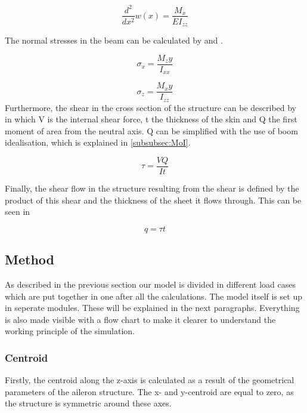\begin{equation}
    \frac{d^2}{d x^2}w(x) = \frac{M_x}{E I_{zz}}
    \label{eq:Beamformula}
\end{equation}

\noindent The normal stresses in the beam can be calculated by  and  \cite{the_book}.

\begin{equation}
    \sigma_x = \frac{M_z y}{I_{xx}}
    \label{eq:stress_bending_x}
\end{equation}

\begin{equation}
    \sigma_z = \frac{M_x y}{I_{zz}}
    \label{eq:stress_bending_z}
\end{equation}
Furthermore, the shear in the cross section of the structure can be described by  in which V is the internal shear force,  t the thickness of the skin and Q the first moment of area from the neutral axis\cite{the_book}. Q can be simplified with the use of boom idealisation, which is explained in \autoref{subsubsec:MoI}. 

\begin{equation}
    \tau = \frac{V Q}{I t}
    \label{eq:bending_shear}
\end{equation}

\noindent Finally, the shear flow in the structure resulting from the shear is defined by the product of this shear and the thickness of the sheet it flows through. This can be seen in 

\begin{equation}
\label{eq:shearflow}
    q=\tau t
\end{equation}
\subsection{Method}
As described in the previous section our model is divided in different load cases which are put together in one after all the calculations. The model itself is set up in seperate modules. 
These will be explained in the next paragraphs. Everything is also made visible with a flow chart to make it clearer to understand the working principle of the simulation.

\subsubsection{Centroid}
Firstly, the centroid along the z-axis is calculated as a result of the geometrical parameters of the aileron structure. The x- and y-centroid are equal to zero, as the structure is symmetric around these axes.

